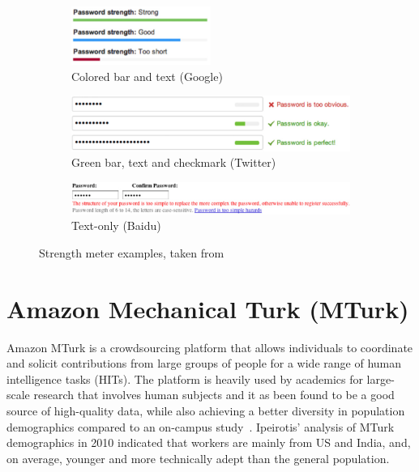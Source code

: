     \begin{figure}[H]
        \begin{subfigure}[t]{\textwidth}
            \includegraphics[width=0.5\textwidth]{Images/str-meter-google}
            \caption{Colored bar and text (Google)}
        \end{subfigure}

        \begin{subfigure}[t]{\textwidth}
            \includegraphics[width=\textwidth]{Images/str-meter-twitter}
            \caption{Green bar, text and checkmark (Twitter)}
        \end{subfigure}

        \begin{subfigure}[t]{\textwidth}
            \includegraphics[width=\textwidth]{Images/str-meter-baidu}
            \caption{Text-only (Baidu)}
        \end{subfigure}

      \caption{Strength meter examples, taken from \cite{strength_meter_effect}}
      \label{fig:str_meter_examples}
    \end{figure}


  \section{Amazon Mechanical Turk (MTurk)}
    \label{sec:mturk}
    Amazon MTurk is a crowdsourcing platform that allows individuals to coordinate and solicit contributions from large groups of people for a wide range of human intelligence tasks (HITs). The platform is heavily used by academics for large-scale research that involves human subjects and it as been found to be a good source of high-quality data, while also achieving a better diversity in population demographics compared to an on-campus study~\cite{turk1,turk2}. Ipeirotis' analysis of MTurk demographics in 2010 indicated that workers are mainly from US and India, and, on average, younger and more technically adept than the general population\cite{mturk_demographic}.